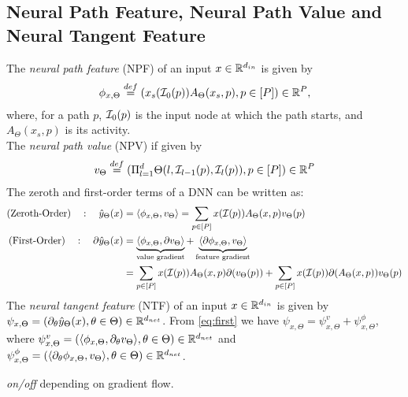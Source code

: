 \subsection{Neural Path Feature, Neural Path Value and Neural Tangent Feature}
The \emph{neural path feature} (NPF) of an input $x\in\mathbb{R}^{d_{in}}$ is given by 
\begin{align}\label{eq:npfdef}
\phi_{x,\Theta}\stackrel{def}=(x_s(\mathcal{I}_0(p))A_{\Theta}(x_s,p) ,p\in[P])\in\mathbb{R}^P,
\end{align}
where, for a path $p$, $\mathcal{I}_0(p)$ is the input node at which the path starts, and $A_{\Theta}(x_s,p)$ is its activity. \\
The \emph{neural path value} (NPV) if given by  
\begin{align}\label{eq:npvdef}
v_{\Theta}\stackrel{def}=(\Pi_{l=1}^d \Theta(l,\mathcal{I}_{l-1}(p),\mathcal{I}_l(p)),p\in[P])\in\mathbb{R}^P
\end{align}
The zeroth and first-order terms of a DNN can be written as:
\begin{align}
\label{eq:zero}\text{(Zeroth-Order)}\quad: \quad \hat{y}_{\Theta}(x)&=\langle \phi_{x,\Theta},v_{\Theta}\rangle=\sum_{p\in [P]}x(\mathcal{I}(p))A_{\Theta}(x,p)v_{\Theta}(p)\\
\label{eq:first}\text{(First-Order)}\quad: \quad \partial \hat{y}_{\Theta}(x)&=\underbrace{\langle \phi_{x,\Theta},\partial v_{\Theta}\rangle}_{\text{value gradient}}+ \underbrace{\langle \partial\phi_{x,\Theta},v_{\Theta}\rangle}_{\text{feature gradient}}\\&=\sum_{p\in [P]}x(\mathcal{I}(p)) A_{\Theta}(x,p) \partial(v_{\Theta}(p))+\sum_{p\in [P]}x(\mathcal{I}(p)) \partial(A_{\Theta}(x,p)) v_{\Theta}(p)\nonumber
\end{align}
The \emph{neural tangent feature} (NTF) of an input $x\in\mathbb{R}^{d_{in}}$ is given by $\psi_{x,\Theta}=\left(\partial_{\theta}\hat{y}_{\Theta}(x),\theta\in\Theta\right)\in\mathbb{R}^{d_{net}}$. From \eqref{eq:first} we have $\psi_{x,\Theta}=\psi^v_{x,\Theta}+\psi^{\phi}_{x,\Theta}$, where $\psi^v_{x,\Theta}=\left(\langle \phi_{x,\Theta}, \partial_{\theta} v_{\Theta}\rangle,\theta\in\Theta\right)\in\mathbb{R}^{d_{net}}$ and  $\psi^{\phi}_{x,\Theta}=\left(\langle \partial_{\theta}\phi_{x,\Theta}, v_{\Theta}\rangle,\theta\in\Theta\right)\in\mathbb{R}^{d_{net}}$. 

\emph{on/off} depending on gradient flow.
